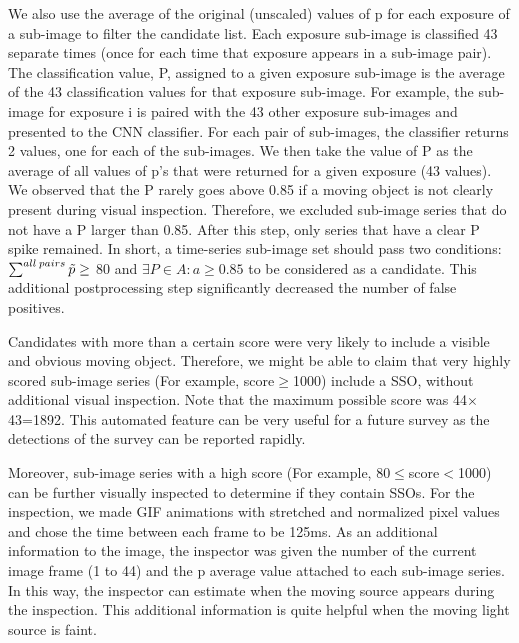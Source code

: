 We also use the average of the original (unscaled) values of p for each exposure of a sub-image to filter the candidate list.
Each exposure sub-image is classified 43 separate times (once for each time that exposure appears in a sub-image pair).
The classification value, P, assigned to a given exposure sub-image is the average of the 43 classification values for that exposure sub-image.
For example, the sub-image for exposure i is paired with the 43 other exposure sub-images and presented to the CNN classifier.  
For each pair of sub-images, the classifier returns 2 values, one for each of the sub-images.  
We then take the value of P as the average of all values of p's that were returned for a given exposure (43 values). 
We observed that the P rarely goes above 0.85 if a moving object is not clearly present during visual inspection.
Therefore, we excluded sub-image series that do not have a P larger than 0.85.
After this step, only series that have a clear P spike remained.
In short, a time-series sub-image set should pass two conditions: $\sum^{all\:pairs}\Tilde{p}\geq$ 80 and $\exists P \in A : a \geq 0.85$ to be considered as a candidate.
This additional postprocessing step significantly decreased the number of false positives.


Candidates with more than a certain score were very likely to include a visible and obvious moving object.
Therefore, we might be able to claim that very highly scored sub-image series (For example, score$\geq$1000) include a SSO, without additional visual inspection.
Note that the maximum possible score was 44$\times$43=1892.
This automated feature can be very useful for a future survey as the detections of the survey can be reported rapidly.

Moreover, sub-image series with a high score (For example, 80$\leq$score$<$1000) can be further visually inspected to determine if they contain SSOs.
For the inspection, we made GIF animations with stretched and normalized pixel values and chose the time between each frame to be 125ms.
As an additional information to the image, the inspector was given the number of the current image frame (1 to 44) and the p average value attached to each sub-image series.
In this way, the inspector can estimate when the moving source appears during the inspection.
This additional information is quite helpful when the moving light source is faint.

